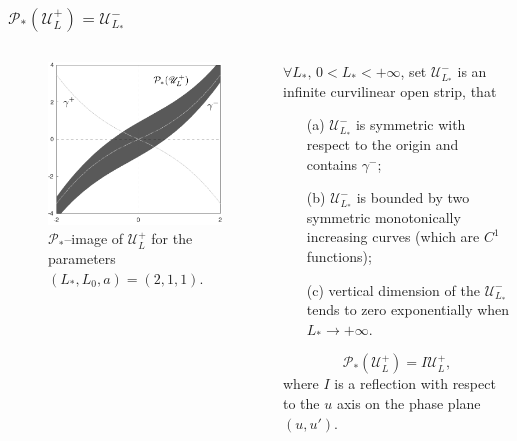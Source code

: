 \documentclass [10pt] {beamer}
\begin{document}
\begin{frame}
	\frametitle{$\mathcal{P}_*(\mathscr{U}_L^+) = \mathscr{U}_{L_*}^-$}
	\begin{columns}[T]
		\begin{column}{.5\textwidth}
			\begin{figure}
			\includegraphics[width = 1\textwidth]{pic/h-strips-step-2.pdf}
			\caption{$\mathcal{P}_*$--image of $\mathscr{U}_L^+$ for the parameters $(L_*, L_0, a) = (2, 1, 1)$.}
			\label{pic:h-striprs-step-2}
			\end{figure}
		\end{column}
		\begin{column}{.5\textwidth}
			\begin{theorem}
				$\forall L_*, \, 0 < L_* < +\infty$, set $\mathscr{U}_{L_*}^-$ is an infinite curvilinear open strip, that
				\begin{enumerate}
					\item[(a)] $\mathscr{U}_{L_*}^-$ is symmetric with respect to the origin and contains $\gamma^-$;
					\item[(b)] $\mathscr{U}_{L_*}^-$ is bounded by two symmetric monotonically increasing curves (which are $C^1$ functions);
					\item[(c)] vertical dimension of the $\mathscr{U}_{L_*}^-$ tends to zero exponentially when $L_* \to +\infty$.
				\end{enumerate}
			\end{theorem}
			\begin{equation*}
				\mathcal{P}_*(\mathscr{U}_L^+) = I \mathscr{U}_L^+,
			\end{equation*}
			where $I$ is a reflection with respect to the $u$ axis on the phase plane $(u, u')$.
		\end{column}
	\end{columns}
\end{frame}
\end{document}
